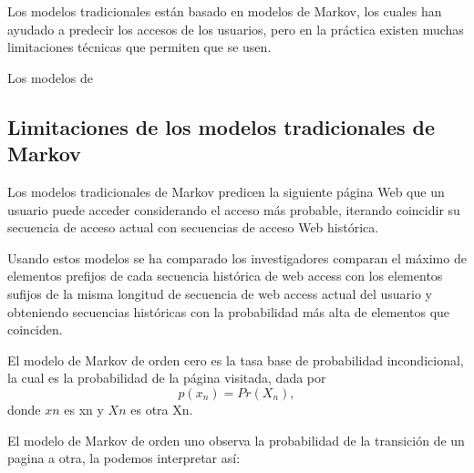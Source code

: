 Los modelos tradicionales están basado en modelos de Markov, los cuales han ayudado a predecir los accesos de los usuarios, pero en la práctica existen 
muchas limitaciones técnicas que permiten que se usen. 

Los modelos de  





 
 
 \subsection{Limitaciones de los modelos tradicionales de Markov}
 
 
 Los modelos tradicionales de Markov predicen la siguiente página Web que un usuario puede acceder considerando el acceso más probable, iterando coincidir su secuencia de acceso actual con secuencias de acceso Web histórica.
 

 
 Usando estos modelos se ha comparado los investigadores comparan el máximo de elementos  prefijos de cada secuencia histórica de web access con los elementos sufijos de la  misma longitud de secuencia de web access actual del usuario y obteniendo secuencias históricas con la probabilidad más alta de elementos que coinciden.
 
 El modelo de Markov de orden cero es la tasa base de probabilidad incondicional, la cual es la probabilidad de la página visitada, dada por
 \begin{equation}
p(x_n) = Pr(X_n),
 \end{equation}	
 donde $xn$ es xn y $Xn$ es otra Xn.
 
 El modelo de Markov de orden uno observa la probabilidad de la transición de un pagina a otra, la podemos interpretar así:
 
